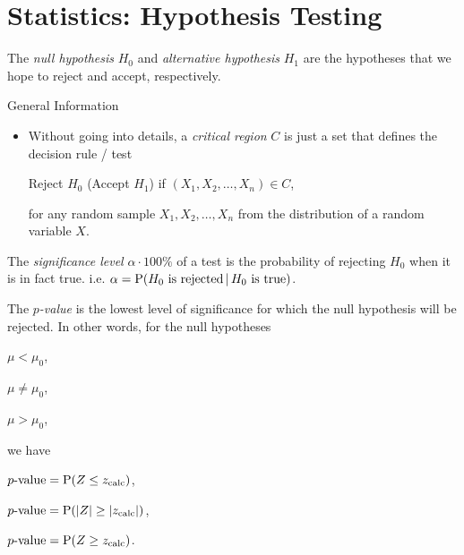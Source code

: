 \documentclass[../Notes.tex]{subfiles}
\begin{document}
\chapter{Statistics: Hypothesis Testing}
\begin{definition}{}{}
  The \emph{null hypothesis} \(H_0\) and \emph{alternative hypothesis} \(H_1\) are the hypotheses that we hope to reject and accept, respectively. 
\end{definition}
\begin{stbox}{General Information}
  \begin{itemize}
    \item Without going into details, a \emph{critical region} \(C\) is just a set that defines the decision rule / test 
    \begin{center}
      Reject \(H_0\) (Accept \(H_1\)) \quad if \((X_1,X_2,\dots,X_n)\in C\),
    \end{center}
    for any random sample \(X_1,X_2,\dots,X_n\) from the distribution of a random variable \(X\).
  \end{itemize}
\end{stbox}
\begin{definition}{}{}
  The \emph{significance level} \(\alpha\cdot100\%\) of a test is the probability of rejecting \(H_0\) when it is in fact true. i.e. \(\alpha=\operatorname{P}(H_0\text{ is rejected}\,\vert\,H_0\text{ is true})\).
\end{definition}
\begin{definition}{}{}
  The \emph{\(p\)-value} is the lowest level of significance for which the null hypothesis will be rejected. In other words, for the null hypotheses
    \begin{center}
      \begin{enumerate*}[label=(\alph*),itemjoin={\quad}]
        \item \(\mu<\mu_0\),
        \item \(\mu \neq \mu_0\),
        \item \(\mu>\mu_0\),
      \end{enumerate*}
    \end{center}
    we have
    \begin{center}
      \begin{enumerate*}[label=(\alph*),itemjoin={\quad}]
        \item \(p\text{-value}=\operatorname{P}(Z\leq z_\text{calc})\),
        \item \(p\text{-value}=\operatorname{P}(\lvert Z \rvert\geq \lvert z_\text{calc} \rvert)\),
        \item \(p\text{-value}=\operatorname{P}(Z\geq z_\text{calc})\).
      \end{enumerate*}
    \end{center}
\end{definition}
\end{document}
